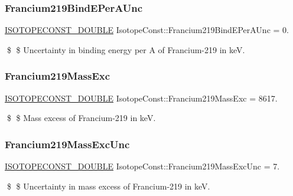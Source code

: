 \subsubsection{\texorpdfstring{Francium219\+Bind\+E\+Per\+A\+Unc}{Francium219BindEPerAUnc}}
{\footnotesize\ttfamily \mbox{\hyperlink{group___isotope_const-_macros_ga8f45a7272ce02c0b4c65c44636ed719a}{I\+S\+O\+T\+O\+P\+E\+C\+O\+N\+S\+T\+\_\+\+D\+O\+U\+B\+LE}} Isotope\+Const\+::\+Francium219\+Bind\+E\+Per\+A\+Unc = 0.}

\$ \$ Uncertainty in binding energy per A of Francium-\/219 in keV. \mbox{\label{group___isotope_const-_francium-_fr219_gaefa73252056a0db62fa2e4950fbf5968}} 
\subsubsection{\texorpdfstring{Francium219\+Mass\+Exc}{Francium219MassExc}}
{\footnotesize\ttfamily \mbox{\hyperlink{group___isotope_const-_macros_ga8f45a7272ce02c0b4c65c44636ed719a}{I\+S\+O\+T\+O\+P\+E\+C\+O\+N\+S\+T\+\_\+\+D\+O\+U\+B\+LE}} Isotope\+Const\+::\+Francium219\+Mass\+Exc = 8617.}

\$ \$ Mass excess of Francium-\/219 in keV. \mbox{\label{group___isotope_const-_francium-_fr219_ga1d4dca28ea9a0f6e704dcdab2b44a9be}} 
\subsubsection{\texorpdfstring{Francium219\+Mass\+Exc\+Unc}{Francium219MassExcUnc}}
{\footnotesize\ttfamily \mbox{\hyperlink{group___isotope_const-_macros_ga8f45a7272ce02c0b4c65c44636ed719a}{I\+S\+O\+T\+O\+P\+E\+C\+O\+N\+S\+T\+\_\+\+D\+O\+U\+B\+LE}} Isotope\+Const\+::\+Francium219\+Mass\+Exc\+Unc = 7.}

\$ \$ Uncertainty in mass excess of Francium-\/219 in keV. \mbox{\label{group___isotope_const-_francium-_fr219_gaf0f878fb89312cf5648be5482eb548fa}} 
